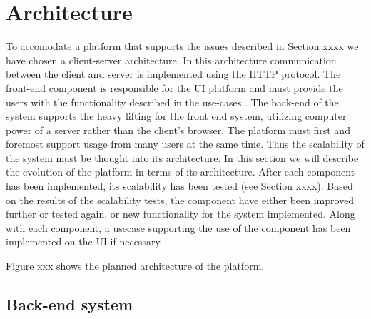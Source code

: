 \section{Architecture}
To accomodate a platform that supports the issues described in Section xxxx  we have chosen a client-server architecture. 
In this architecture communication between the client and server is implemented using the HTTP protocol. 
The front-end component is responsible for the UI platform and must provide the users with the functionality described in the use-cases .
The back-end of the system supports the heavy lifting for the front end system, utilizing computer power of a server rather than the client's browser. 
The platform must first and foremost support usage from many users at the same time. 
Thus the scalability of the system must be thought into its architecture. 
In this section we will describe the evolution of the platform in terms of its architecture.
After each component has been implemented, its scalability has been tested (see Section xxxx).
Based on the results of the scalability tests, the component have either been improved further or tested again, or new functionality for the system implemented. 
Along with each component, a usecase supporting the use of the component has been implemented on the UI if necessary. 


Figure xxx shows the planned architecture of the platform. 



\subsection{Back-end system}
